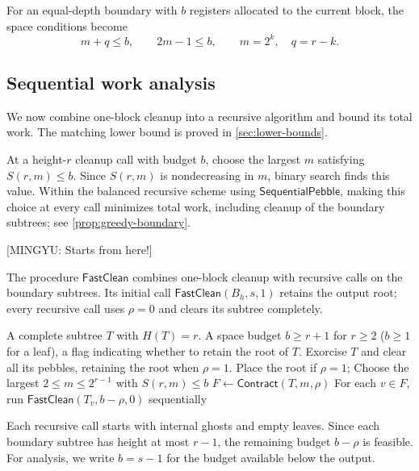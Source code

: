\documentclass[11pt]{article}
\theoremstyle{definition}
\theoremstyle{remark}
\newcommand{\Fast}{\mathsf{SequentialPebble}}
\newcommand{\Clean}{\mathsf{FastClean}}
\newcommand{\Contract}{\mathsf{Contract}}
\newcommand{\mingyu}[1]{{\color{magenta}\footnotesize [MINGYU: #1]}} %
\begin{document}
For an equal-depth boundary with $b$ registers allocated to the current block, the space conditions become
\begin{equation}
 m+q\le b,\qquad 2m-1\le b,\qquad m=2^k,\quad q=r-k.
 \label{eq:feasible-cut}
\end{equation}

\subsection{Sequential work analysis}
\label{sec:sequential}

We now combine one-block cleanup into a recursive algorithm and bound its total work. The matching lower bound is proved in \cref{sec:lower-bounds}.

At a height-$r$ cleanup call with budget $b$, choose the largest $m$ satisfying $S(r,m)\le b$. Since $S(r,m)$ is nondecreasing in $m$, binary search finds this value. Within the balanced recursive scheme using $\Fast$, making this choice at every call minimizes total work, including cleanup of the boundary subtrees; see \cref{prop:greedy-boundary}.

\mingyu{Starts from here!}

The procedure $\Clean$ combines one-block cleanup with recursive calls on the boundary subtrees. Its initial call $\Clean(B_h,s,1)$ retains the output root; every recursive call uses $\rho=0$ and clears its subtree completely.

\begin{algorithm}[H]
\caption{Complete-tree block cleanup $\Clean(T,b,\rho)$}
\label{alg:seq-clean}
\begin{algorithmic}[1]
\Require A complete subtree $T$ with $H(T)=r$.
\Require A space budget $b\ge r+1$ for $r\ge2$ ($b\ge1$ for a leaf), a flag indicating whether to retain the root of $T$.
\Ensure Exorcise $T$ and clear all its pebbles, retaining the root when $\rho=1$.
 \State Place the root if $\rho=1$; \Return
\EndIf
\State Choose the largest $2\le m\le2^{r-1}$ with $S(r,m)\le b$
\State $F\gets\Contract(T,m,\rho)$
\State For each $v\in F$, run $\Clean(T_v,b-\rho,0)$ sequentially
\end{algorithmic}
\end{algorithm}

Each recursive call starts with internal ghosts and empty leaves. Since each boundary subtree has height at most $r-1$, the remaining budget $b-\rho$ is feasible. For analysis, we write $b=s-1$ for the budget available below the output.
\end{document}
